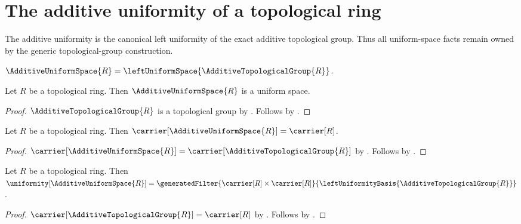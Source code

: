 



\section{The additive uniformity of a topological ring}

The additive uniformity is the canonical left uniformity of the exact
additive topological group.  Thus all uniform-space facts remain owned by the
generic topological-group construction.

\begin{definition}\label{additive_uniform_space}
    $\AdditiveUniformSpace{R}=
        \leftUniformSpace{\AdditiveTopologicalGroup{R}}$.
\end{definition}

\begin{theorem}\label{additive_uniform_space_is_uniform_space}
    Let $R$ be a topological ring.
    Then $\AdditiveUniformSpace{R}$ is a uniform space.
\end{theorem}
\begin{proof}
    $\AdditiveTopologicalGroup{R}$ is a topological group by
        .
    Follows by
        .
\end{proof}

\begin{proposition}\label{additive_uniform_space_carrier}
    Let $R$ be a topological ring.
    Then $\carrier[\AdditiveUniformSpace{R}]=\carrier[R]$.
\end{proposition}
\begin{proof}
    $\carrier[\AdditiveUniformSpace{R}]
        =\carrier[\AdditiveTopologicalGroup{R}]$ by
        .
    Follows by .
\end{proof}

\begin{proposition}\label{additive_uniform_space_uniformity}
    Let $R$ be a topological ring.
    Then $\uniformity[\AdditiveUniformSpace{R}]
        =\generatedFilter{
            \carrier[R]\times\carrier[R]}{
            \leftUniformityBasis{\AdditiveTopologicalGroup{R}}}$.
\end{proposition}
\begin{proof}
    $\carrier[\AdditiveTopologicalGroup{R}]=\carrier[R]$ by
        .
    Follows by
        .
\end{proof}

